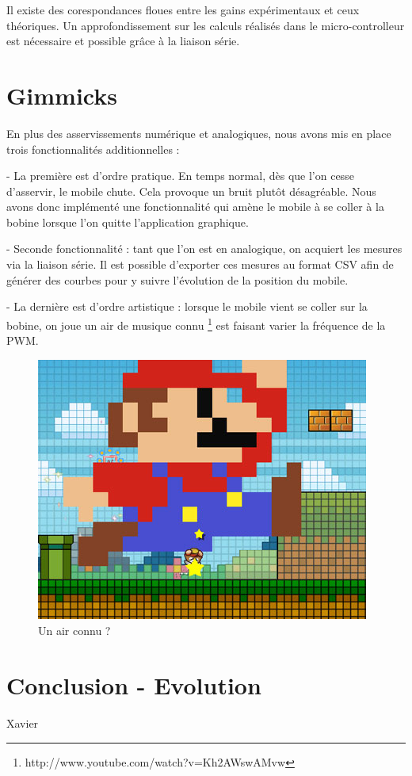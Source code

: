 \documentclass[11pt, french]{article} %
\begin{document}
Il existe des corespondances floues entre les gains expérimentaux et ceux théoriques. Un approfondissement sur les calculs réalisés dans le micro-controlleur est nécessaire et possible grâce à la liaison série.

\section{Gimmicks}
 
 En plus des asservissements numérique et analogiques, nous avons mis en place trois fonctionnalités additionnelles :
 
 \medskip
 
 - La première est d'ordre pratique. En temps normal, dès que l'on cesse d'asservir, le mobile chute. Cela provoque un bruit plutôt désagréable. Nous avons donc implémenté une fonctionnalité qui amène le mobile à se coller à la bobine lorsque l'on quitte l'application graphique. 
 
 - Seconde fonctionnalité : tant que l'on est en analogique, on acquiert les mesures via la liaison série. Il est possible d'exporter ces mesures au format CSV afin de générer des courbes pour y suivre l'évolution de la position du mobile.
 
  - La dernière est d'ordre artistique : lorsque le mobile vient se coller sur la bobine, on joue un air de musique connu \footnote{http://www.youtube.com/watch?v=Kh2AWswAMvw} est faisant varier la fréquence de la PWM. 
  
\begin{figure}[h!]
	\centering
	\includegraphics[width = 4 cm]{SolutionNumerique/mario.png} 
	\caption{Un air connu ?}
\end{figure}
 
 
\section*{Conclusion - Evolution}
Xavier
\end{document}
